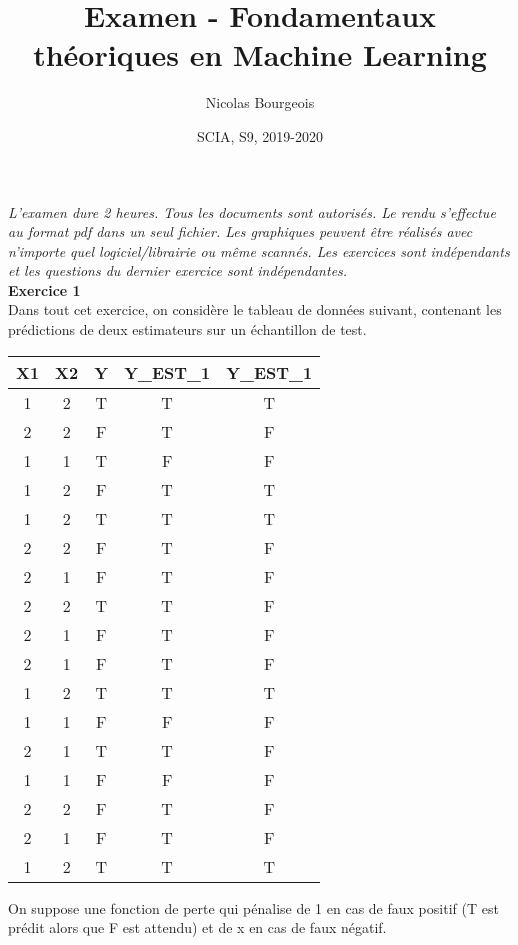 \documentclass[a4paper]{article}
\title{Examen - Fondamentaux théoriques en Machine Learning}
\author{Nicolas Bourgeois}
\date{SCIA, S9, 2019-2020}
\begin{document}
\maketitle

\textit{L'examen dure 2 heures. Tous les documents sont autorisés. Le rendu s'effectue au format pdf dans un seul fichier. Les graphiques peuvent être réalisés avec n'importe quel logiciel/librairie ou même scannés. Les exercices sont indépendants et les questions du dernier exercice sont indépendantes.}\\



\textbf{Exercice 1}\\

Dans tout cet exercice, on considère le tableau de données suivant, contenant les prédictions de deux estimateurs sur un échantillon de test.\\


\begin{center}
\vspace{0.2cm}
\begin{tabular}{|c|c|c|c|c|}
\hline
X1 & X2 & Y & Y\_EST\_1 & Y\_EST\_1 \\
\hline
1 & 2 & T & T & T\\
2 & 2 & F & T & F\\
1 & 1 & T & F & F\\
1 & 2 & F & T & T\\
1 & 2 & T & T & T\\
2 & 2 & F & T & F\\
2 & 1 & F & T & F\\
2 & 2 & T & T & F\\
2 & 1 & F & T & F\\
2 & 1 & F & T & F\\
1 & 2 & T & T & T\\
1 & 1 & F & F & F\\
2 & 1 & T & T & F\\
1 & 1 & F & F & F\\
2 & 2 & F & T & F\\
2 & 1 & F & T & F\\
1 & 2 & T & T & T\\
\hline
\end{tabular}
\end{center}

On suppose une fonction de perte qui pénalise de 1 en cas de faux positif (T est prédit alors que F est attendu) et de x en cas de faux négatif.\\
\end{document}
